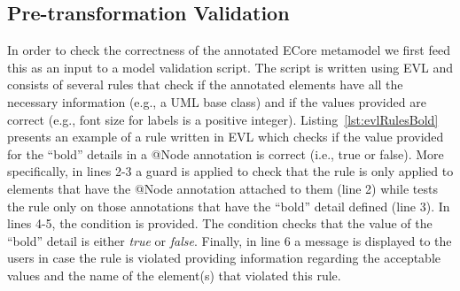 \subsection{Pre-transformation Validation}
In order to check the correctness of the annotated ECore metamodel we first feed this as an input to a model validation script. The script is written using EVL and consists of several rules that check if the annotated elements have all the necessary information (e.g., a UML base class) and if the values provided are correct (e.g., font size for labels is a positive integer). Listing~\ref{lst:evlRulesBold} presents an example of a rule written in EVL which checks if the value provided for the ``bold'' details in a @Node annotation is correct (i.e., true or false). More specifically, in lines 2-3 a guard is applied to check that the rule is only applied to elements that have the @Node annotation attached to them (line 2) while tests the rule only on those annotations that have the ``bold'' detail defined (line 3). In lines 4-5, the condition is provided. The condition checks that the value of the ``bold'' detail is either \textit{true} or \textit{false}. Finally, in line 6 a message is displayed to the users in case the rule is violated providing information regarding the acceptable values and the name of the element(s) that violated this rule.



